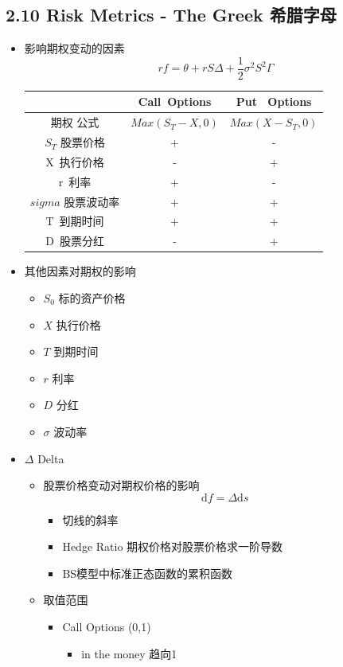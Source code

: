\documentclass[a4paper,6pt,twoside,openany]{article}
\begin{document}
\subsection*{2.10 Risk Metrics - The Greek 希腊字母}
\begin{itemize}
\item 影响期权变动的因素 $$rf = \theta + rS\Delta + \frac{1}{2} \sigma
  ^{2}S^{2}\Gamma$$
  \begin{tabular}{|c|c|c|} \hline & Call\ Options & Put \ Options \\ \hline 期权
    公式 & $Max(S_T - X , 0)$ & $Max(X - S_T,0 )$ \\ \hline $S_T$ 股票价格 & + &
    - \\ \hline X\ 执行价格 & - & + \\ \hline r\ 利率 & + & - \\ \hline $sigma$
    股票波动率 & + & + \\ \hline T\ 到期时间 & + & + \\ \hline D\ 股票分红 & - &
    + \\ \hline
  \end{tabular}
\item 其他因素对期权的影响
  \begin{itemize}
  \item $S_{0}$ 标的资产价格
  \item $X$ 执行价格
  \item $T$ 到期时间
  \item $r$ 利率
  \item $D$ 分红
  \item $\sigma$ 波动率
  \end{itemize}
\item $\Delta$ Delta
  \begin{itemize}
  \item 股票价格变动对期权价格的影响 $$\mathrm{d}f = \Delta \mathrm{d}s$$
    \begin{itemize}
    \item 切线的斜率
    \item Hedge Ratio 期权价格对股票价格求一阶导数
    \item BS模型中标准正态函数的累积函数
    \end{itemize}
  \item 取值范围
    \begin{itemize}
    \item Call Options (0,1)
      \begin{itemize}
      \item in the money 趋向1

\end{itemize}
\end{itemize}
\end{itemize}
\end{itemize}
\end{document}
